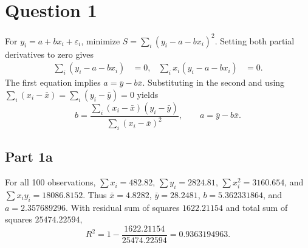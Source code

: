 \documentclass[11pt]{article}
\begin{document}
\section{Question 1}
For $y_i=a+bx_i+\varepsilon_i$, minimize $S=\sum_i(y_i-a-bx_i)^2$. Setting both partial derivatives to zero gives
\begin{align*}
\sum_i(y_i-a-bx_i)&=0, &\sum_i x_i(y_i-a-bx_i)&=0.
\end{align*}
The first equation implies $a=\bar y-b\bar x$. Substituting in the second and using $\sum_i(x_i-\bar x)=\sum_i(y_i-\bar y)=0$ yields
\begin{equation*}
b=\frac{\sum_i(x_i-\bar x)(y_i-\bar y)}{\sum_i(x_i-\bar x)^2},\qquad a=\bar y-b\bar x.
\end{equation*}
\subsection{Part 1a}
For all 100 observations, $\sum x_i=482.82$, $\sum y_i=2824.81$, $\sum x_i^2=3160.654$, and $\sum x_iy_i=18086.8152$. Thus $\bar x=4.8282$, $\bar y=28.2481$, $b=5.362331864$, and $a=2.357689296$. With residual sum of squares $1622.21154$ and total sum of squares $25474.22594$,
\begin{equation*}
R^2=1-\frac{1622.21154}{25474.22594}=0.9363194963.
\end{equation*}
\end{document}
